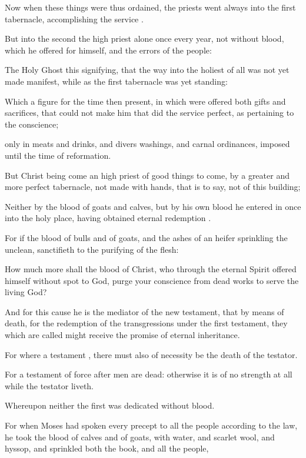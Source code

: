 {Now
when these
things
were
thus
ordained, the
priests
went
always
into
the
first
tabernacle,
accomplishing the
service
{}.

But
into the
second
{} the high
priest
alone
once every
year,
not
without
blood,
which he
offered
for
himself,
and
{} the
errors of the
people:

The
Holy
Ghost
this
signifying, that the
way into the holiest of
all
was not
yet made
manifest, while
as
the
first
tabernacle
was
yet
standing:

Which
{} a
figure
for the
time then
present,
in
which were
offered
both
gifts
and
sacrifices,
that
could
not
make him that did the
service
perfect, as pertaining
to the
conscience;

only
in
meats
and
drinks,
and
divers
washings,
and
carnal
ordinances,
imposed
{}
until the
time of
reformation.

But
Christ being
come an high
priest of good
things to
come,
by
a
greater
and more
perfect
tabernacle,
not made with
hands,
that is to
say,
not
of
this
building;

Neither
by the
blood of
goats
and
calves,
but
by his
own
blood he entered
in
once
into the holy
place, having
obtained
eternal
redemption
{}.

For
if the
blood of
bulls
and of
goats,
and the
ashes of an
heifer
sprinkling the
unclean,
sanctifieth
to the
purifying of the
flesh:

How
much
more
shall the
blood of
Christ,
who
through
the
eternal
Spirit
offered
himself without
spot to
God,
purge
your
conscience
from
dead
works
to
serve
the
living
God?

And
for this
cause he
is the
mediator of
the
new
testament,
that by
means of
death,
for the
redemption of the
transgressions
{}
under
the
first
testament,
they which are
called might
receive the
promise
of
eternal
inheritance.

For
where a
testament
{}, there must also of necessity be the
death of the
testator.

For a
testament
{} of
force
after men are
dead:
otherwise it is
of
no
strength at
all
while the
testator
liveth.

Whereupon
neither the
first
{} was
dedicated
without
blood.

For
when
Moses had
spoken
every
precept
to
all the
people according
to the
law, he
took the
blood of
calves
and of
goats,
with
water,
and
scarlet
wool,
and
hyssop, and
sprinkled
both the
book,
and
all the
people,

}
